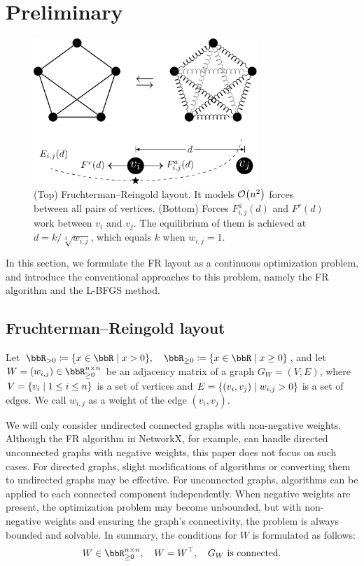 \documentclass[dvipdfmx,lettersize,journal]{IEEEtran}
\newcommand{\defeq}{\coloneqq}
\begin{document}
\section{Preliminary}\label{sec:preliminary}

\begin{figure}[t]
  \centering
  \includegraphics[height=5.5cm]{fr_layout/fr_layout.pdf}
  \caption{
    (Top) Fruchterman--Reingold layout. It models $\order{n^2}$ forces between all pairs of vertices.
    (Bottom) Forces $F_{i,j}^a(d)$ and $F^r(d)$ work between $v_i$ and $v_j$. The equilibrium of them is achieved at $d = k/\sqrt[3]{w_{i,j}}$, which equals $k$ when $w_{i,j} = 1$.
  }
  \label{fig:frLayout}
\end{figure}

In this section, we formulate the FR layout as a continuous optimization problem, and introduce the conventional approaches to this problem, namely the FR algorithm and the L-BFGS method.

\subsection{Fruchterman--Reingold layout}\label{ssec:frLayout}

Let $\bbR_{> 0} \defeq \qty{ x \in \bbR \mid x > 0 }, \quad \bbR_{\geq 0} \defeq \qty{ x \in \bbR \mid x \geq 0 }$, and let $W = (w_{i,j}) \in \bbR_{\geq 0}^{n \times n}$ be an adjacency matrix of a graph $G_W = (V, E)$, where $V = \qty{v_i \mid 1 \leq i \leq n}$ is a set of vertices and $E = \qty{(v_i, v_j) \mid w_{i,j} > 0}$ is a set of edges. We call $w_{i,j}$ as a weight of the edge $(v_i, v_j)$.

We will only consider undirected connected graphs with non-negative weights.
Although the FR algorithm in NetworkX, for example, can handle directed unconnected graphs with negative weights, this paper does not focus on such cases.
For directed graphs, slight modifications of algorithms or converting them to undirected graphs may be effective.
For unconnected graphs, algorithms can be applied to each connected component independently.
When negative weights are present, the optimization problem may become unbounded, but with non-negative weights and ensuring the graph's connectivity, the problem is always bounded and solvable.
In summary, the conditions for $W$ is formulated as follows:
\begin{equation}\label{eq:WCondition}
  W \in \bbR_{\geq 0}^{n \times n}, \quad W = W^\top, \quad \text{$G_W$ is connected}.
\end{equation}
\end{document}
